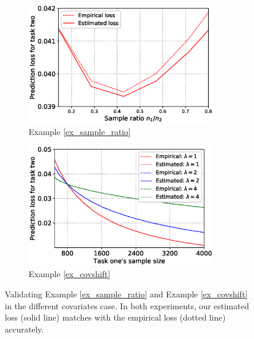\begin{figure}[!t]
	\centering
	\begin{subfigure}[b]{0.5\textwidth}
		\centering
		\includegraphics[width=0.9\textwidth]{figures/sample_ratio.eps}
		\caption{Example \ref{ex_sample_ratio}}
		\label{fig_size}
	\end{subfigure}\hfill
	\begin{subfigure}[b]{0.5\textwidth}
		\centering
		\includegraphics[width=0.9\textwidth]{figures/covariate_shift.eps}
		\caption{Example \ref{ex_covshift}}
		\label{fig_covariate}
	\end{subfigure}
	\caption{%
	Validating Example \ref{ex_sample_ratio} and Example \ref{ex_covshift} in the different covariates case.
	In both experiments, our estimated loss (solid line) matches with the empirical loss (dotted line) accurately.
}
\end{figure}
